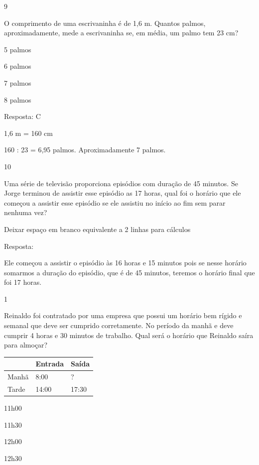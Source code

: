\num{9}

O comprimento de uma escrivaninha é de 1,6 m. Quantos palmos,
aproximadamente, mede a escrivaninha se, em média, um palmo tem 23 cm?

\begin{escolha}

\item
  5 palmos
\item
  6 palmos
\item
  7 palmos
\item
  8 palmos
\end{escolha}

Resposta: C

1,6 m = 160 cm

160 : 23 = 6,95 palmos. Aproximadamente 7 palmos.

\num{10}

Uma série de televisão proporciona episódios com duração de 45 minutos.
Se Jorge terminou de assistir esse episódio as 17 horas, qual foi o
horário que ele começou a assistir esse episódio se ele assistiu no
início ao fim sem parar nenhuma vez?

Deixar espaço em branco equivalente a 2 linhas para cálculos

Resposta:

Ele começou a assistir o episódio às 16 horas e 15 minutos pois se nesse
horário somarmos a duração do episódio, que é de 45 minutos, teremos o
horário final que foi 17 horas.


\num{1}

Reinaldo foi contratado por uma empresa que possui um horário bem rígido
e semanal que deve ser cumprido corretamente. No período da manhã e deve
cumprir 4 horas e 30 minutos de trabalho. Qual será o horário que
Reinaldo saíra para almoçar?

\begin{longtable}[]{@{}lll@{}}
\toprule
& Entrada & Saída\tabularnewline
\midrule
\endhead
Manhã & 8:00 & ?\tabularnewline
Tarde & 14:00 & 17:30\tabularnewline
\bottomrule
\end{longtable}

\begin{escolha}
\item
  11h00
\item
  11h30
\item
  12h00
\item
  12h30
\end{escolha}

